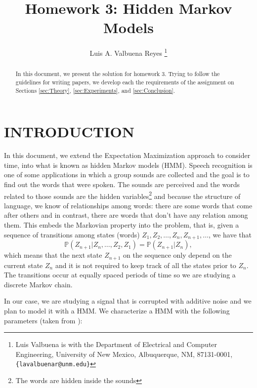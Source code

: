 \documentclass[letterpaper, 10 pt, conference]{ieeeconf}  %
\title{\LARGE \bf
Homework 3: Hidden Markov Models
}
\author{Luis A. Valbuena Reyes%
\thanks{Luis Valbuena is with the Department of Electrical and Computer Engineering,
        University of New Mexico, Albuquerque, NM, 87131-0001, {\tt\small \{lavalbuenar@unm.edu\}}}%
}
\begin{document}
\newtheorem{theoremMyThesis}{Theorem}
\newtheorem{corollary}{Corollary}
\newtheorem{problemStatement}{Problem Statement}

\maketitle
\thispagestyle{empty}
\pagestyle{empty}


\begin{abstract}

In this document, we present the solution for homework 3. Trying to follow the guidelines for writing papers, we develop each the requirements of the assignment on Sections \ref{sec:Theory}, \ref{sec:Experiments}, and \ref{sec:Conclusion}.
\end{abstract}



\section{INTRODUCTION}
\label{sec:Intro}

In this document, we extend the Expectation Maximization approach to consider time, into what is known as hidden Markov models (HMM). Speech recognition is one
of some applications in which a group sounds are collected and the goal is to find out the words that were spoken. The sounds are perceived and the words related
to those sounds are the hidden variables\footnote{The words are hidden inside the sounds} and because the structure of language, we know of relationships among 
words: there are some words that come after others and in contrast, there are words that don't have any relation among them. This embeds the Markovian property 
into the problem, that is, given a sequence of transitions among states (words) $Z_{1}, Z_{2},\hdots,Z_{n},Z_{n+1}, \hdots$, we have that
\begin{equation*}
 \mathbb{P}(Z_{n+1} |Z_{n},\hdots, Z_{2},Z_{1}) =  \mathbb{P}(Z_{n+1} |Z_{n}),
\end{equation*} 
which means that the next state $Z_{n+1}$ on the sequence only depend on the current state $Z_{n}$ and it is not required to keep track of all the states prior to $Z_{n}$. The
transitions occur at equally spaced periods of time so we are studying a discrete Markov chain.

In our case, we are studying a signal that is corrupted with additive noise and we plan to model it with a HMM. We characterize a HMM with the following parameters (taken 
from\cite{HMM_Rabiner} ):
\end{document}
